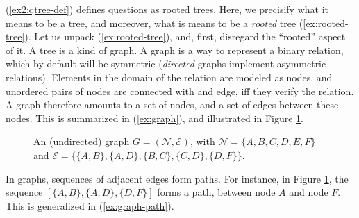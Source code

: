 (\ref{ex2:qtree-def}) defines questions as rooted trees. Here, we precisify what it means to be a tree, and moreover, what is means to be a \textit{rooted} tree (\ref{ex:rooted-tree}). Let us unpack  (\ref{ex:rooted-tree}), and, first, disregard the ``rooted'' aspect of it. A tree is a kind of graph. A graph is a way to represent a binary relation, which by default will be symmetric (\textit{directed} graphs implement asymmetric relations). Elements in the domain of the relation are modeled as nodes, and unordered pairs of nodes are connected with and edge, iff they verify the relation. A graph therefore amounts to a set of nodes, and a set of edges between these nodes. This is summarized in (\ref{ex:graph}), and illustrated in Figure \ref{fig:basic-graph}.

\begin{exe}
	\label{ex:rooted-tree}
	\label{ex:graph}
\end{exe}

\begin{figure}[H]
	\centering
	\caption{An (undirected) graph $G=(\mathcal{N}, \mathcal{E})$, with $\mathcal{N}=\lbrace A, B, C, D, E, F\rbrace$ and $\mathcal{E}=\lbrace \lbrace A, B\rbrace, \lbrace A, D\rbrace, \lbrace B, C\rbrace, \lbrace C, D\rbrace, \lbrace D, F\rbrace\rbrace$.}\label{fig:basic-graph}
\end{figure}

In graphs, sequences of adjacent edges form paths. For instance, in Figure \ref{fig:basic-graph}, the sequence $[\lbrace A, B\rbrace, \lbrace A, D\rbrace, \lbrace D, F\rbrace]$ forms a path, between node $A$ and node $F$. This is generalized in (\ref{ex:graph-path}).

